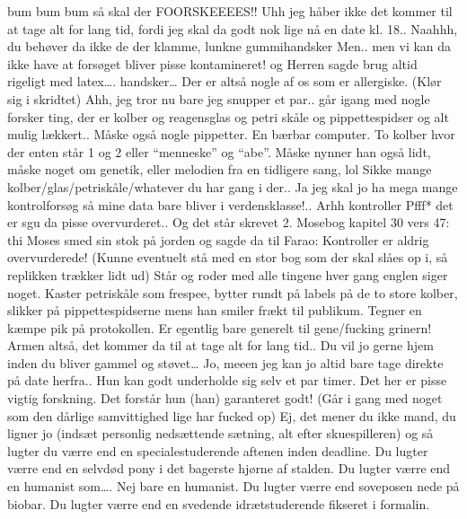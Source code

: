 \documentclass[a4paper,11pt]{article}
\begin{document}
\begin{sketch}




 bum bum bum så skal der FOORSKEEEES!!
 Uhh jeg håber ikke det kommer til at tage alt for lang tid, fordi jeg skal da godt nok lige nå en date kl. 18.. 
 Naahhh, du behøver da ikke de der klamme, lunkne gummihandsker
 Men.. men vi kan da ikke have at forsøget bliver pisse kontamineret!
 og Herren sagde brug altid rigeligt med latex…. handsker…
Der er altså nogle af os som er allergiske. (Klør sig i skridtet)
 Ahh, jeg tror nu bare jeg snupper et par..
 går igang med nogle forsker ting, der er kolber og reagensglas og petri skåle og pippettespidser og alt mulig lækkert.. Måske også nogle pippetter. En bærbar computer. To kolber hvor der enten står 1 og 2 eller “menneske” og “abe”. Måske nynner han også lidt, måske noget om genetik, eller melodien fra en tidligere sang, lol
 Sikke mange kolber/glas/petriskåle/whatever du har gang i der.. 
 Ja jeg skal jo ha mega mange kontrolforsøg så mine data bare bliver i verdensklasse!..
 Arhh kontroller Pfff* det er sgu da pisse overvurderet.. 
 Og det står skrevet 2. Mosebog kapitel 30 vers 47: thi Moses smed sin stok på jorden og sagde da til Farao: Kontroller er aldrig overvurderede! (Kunne eventuelt stå med en stor bog som der skal slåes op i, så replikken trækker lidt ud) 
 Står og roder med alle tingene hver gang englen siger noget. Kaster petriskåle som frespee, bytter rundt på labels på de to store kolber, slikker på pippettespidserne mens han  smiler frækt til publikum. Tegner en kæmpe pik  på protokollen. Er egentlig bare generelt til gene/fucking grinern!
 Armen altså, det kommer da til at tage alt for lang tid.. Du vil jo gerne hjem inden du bliver gammel og støvet…  
 Jo, meeen jeg kan jo altid bare tage direkte på date herfra.. Hun kan godt underholde sig selv et par timer. Det her er pisse vigtig forskning. Det forstår hun (han) garanteret godt! (Går i gang med noget som den dårlige samvittighed lige har fucked op) 
 Ej, det mener du ikke mand, du ligner jo (indsæt personlig nedsættende sætning, alt efter skuespilleren) og så lugter du værre end en specialestuderende aftenen inden deadline. Du lugter værre end en selvdød pony i det bagerste hjørne af stalden. Du lugter værre end en humanist som…. Nej bare en humanist. Du lugter værre end soveposen nede på biobar. Du lugter værre end en svedende idrætstuderende fikseret i formalin.

\end{sketch}
\end{document}
